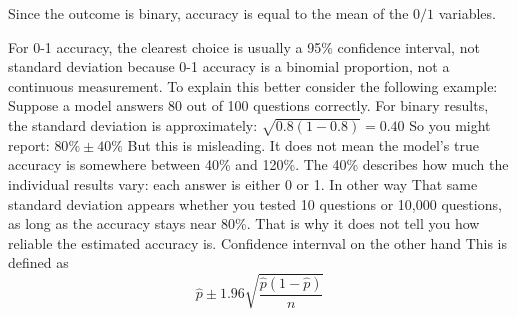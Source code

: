 Since the outcome is binary, accuracy is equal to the mean of the \(0/1\) variables.

For 0-1 accuracy, the clearest choice is usually a 95\% confidence interval, not standard deviation because 0-1 accuracy is a binomial proportion, not a continuous measurement.
To explain this better consider the following example:
Suppose a model answers 80 out of 100 questions correctly.
For binary results, the standard deviation is approximately:
\(\sqrt{0.8(1-0.8)} = 0.40\)
So you might report:
\(80\% \pm 40\%\)
But this is misleading. 
It does not mean the model's true accuracy is somewhere between 40\% and 120\%.
The 40\% describes how much the individual results vary: each answer is either 0 or 1.
In other way That same standard deviation appears whether you tested 10 questions or 10,000 questions, as long as the accuracy stays near 80\%. 
That is why it does not tell you how reliable the estimated accuracy is.
Confidence internval on the other hand 
This is defined as 
\[
\hat p \pm 1.96 \sqrt{\frac{\hat p(1-\hat p)}{n}}
\]


